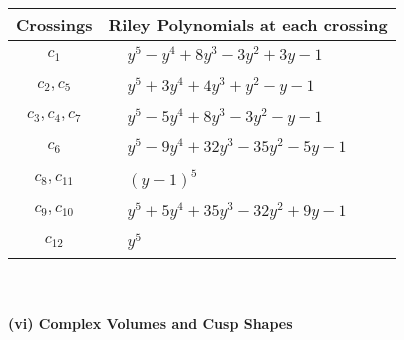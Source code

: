 \documentclass[1p]{elsarticle_modified}
\theoremstyle{definition}
\begin{document}
\begin{tabular}{m{50pt}|m{274pt}}
Crossings & \hspace{64pt}Riley Polynomials at each crossing \\
\hline $$\begin{aligned}c_{1}\end{aligned}$$&$\begin{aligned}
&y^5- y^4+8 y^3-3 y^2+3 y-1
\end{aligned}$\\
\hline $$\begin{aligned}c_{2},c_{5}\end{aligned}$$&$\begin{aligned}
&y^5+3 y^4+4 y^3+y^2- y-1
\end{aligned}$\\
\hline $$\begin{aligned}c_{3},c_{4},c_{7}\end{aligned}$$&$\begin{aligned}
&y^5-5 y^4+8 y^3-3 y^2- y-1
\end{aligned}$\\
\hline $$\begin{aligned}c_{6}\end{aligned}$$&$\begin{aligned}
&y^5-9 y^4+32 y^3-35 y^2-5 y-1
\end{aligned}$\\
\hline $$\begin{aligned}c_{8},c_{11}\end{aligned}$$&$\begin{aligned}
&(y-1)^5
\end{aligned}$\\
\hline $$\begin{aligned}c_{9},c_{10}\end{aligned}$$&$\begin{aligned}
&y^5+5 y^4+35 y^3-32 y^2+9 y-1
\end{aligned}$\\
\hline $$\begin{aligned}c_{12}\end{aligned}$$&$\begin{aligned}
&y^5
\end{aligned}$\\
\hline
\end{tabular}\\~\\
\newpage\flushleft \textbf{(vi) Complex Volumes and Cusp Shapes}
\end{document}
